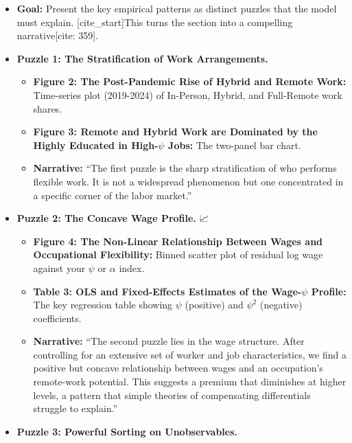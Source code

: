 \documentclass[
  11pt,
  letterpaper,
  DIV=11,
  numbers=noendperiod]{scrartcl}
\providecommand{\tightlist}{%
  \setlength{\itemsep}{0pt}\setlength{\parskip}{0pt}}\usepackage{longtable,booktabs,array}
\begin{document}
\begin{itemize}
\item
  \textbf{Goal:} Present the key empirical patterns as distinct puzzles
  that the model must explain. {[}cite\_start{]}This turns the section
  into a compelling narrative{[}cite: 359{]}.
\item
  \textbf{Puzzle 1: The Stratification of Work Arrangements.} 🔎

  \begin{itemize}
  \tightlist
  \item
    \textbf{Figure 2: The Post-Pandemic Rise of Hybrid and Remote Work:}
    Time-series plot (2019-2024) of In-Person, Hybrid, and Full-Remote
    work shares.
  \item
    \textbf{Figure 3: Remote and Hybrid Work are Dominated by the Highly
    Educated in High-\(\psi\) Jobs:} The two-panel bar chart.
  \item
    \textbf{Narrative:} ``The first puzzle is the sharp stratification
    of who performs flexible work. It is not a widespread phenomenon but
    one concentrated in a specific corner of the labor market.''
  \end{itemize}
\item
  \textbf{Puzzle 2: The Concave Wage Profile.} 📈

  \begin{itemize}
  \tightlist
  \item
    \textbf{Figure 4: The Non-Linear Relationship Between Wages and
    Occupational Flexibility:} Binned scatter plot of residual log wage
    against your \(\psi\) or \(\alpha\) index.
  \item
    \textbf{Table 3: OLS and Fixed-Effects Estimates of the
    Wage-\(\psi\) Profile:} The key regression table showing \(\psi\)
    (positive) and \(\psi^2\) (negative) coefficients.
  \item
    \textbf{Narrative:} ``The second puzzle lies in the wage structure.
    After controlling for an extensive set of worker and job
    characteristics, we find a positive but concave relationship between
    wages and an occupation's remote-work potential. This suggests a
    premium that diminishes at higher levels, a pattern that simple
    theories of compensating differentials struggle to explain.''
  \end{itemize}
\item
  \textbf{Puzzle 3: Powerful Sorting on Unobservables.} 🧩


\end{itemize}
\end{document}

